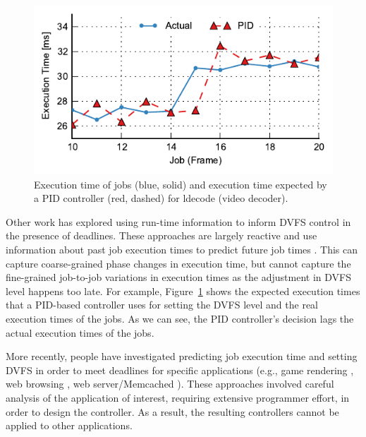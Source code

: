\begin{figure}
  \begin{center}
    \includegraphics{exec_time_prediction/figs/ldecode_pid.pdf}
    \caption{Execution time of jobs (blue, solid) and execution time
    expected by a PID controller (red, dashed) for ldecode (video decoder).}
    \label{fig:exec_time_prediction.applications.ldecode_pid}
  \end{center}
\end{figure}

Other work has explored using run-time information to inform DVFS control in
the presence of deadlines. These approaches are largely reactive and use
information about past job execution times to predict future job times
\cite{gu-dac08, choi-iccad02, pegasus-isca14, nachiappan-hpca15}. This can
capture coarse-grained phase changes in execution time, but cannot capture the
fine-grained job-to-job variations in execution times as the adjustment in DVFS
level happens too late.  For example,
Figure~\ref{fig:exec_time_prediction.applications.ldecode_pid} shows the
expected execution times that a PID-based controller uses for setting the DVFS
level and the real execution times of the jobs. As we can see, the PID
controller's decision lags the actual execution times of the jobs.

More recently, people have investigated predicting job execution time and
setting DVFS in order to meet deadlines for specific applications (e.g., game
rendering \cite{gu-rtas08}, web browsing \cite{zhu-hpca13, eqos-hpca15}, web
server/Memcached \cite{adrenaline-hpca15}). These approaches involved careful
analysis of the application of interest, requiring extensive programmer effort,
in order to design the controller. As a result, the resulting controllers
cannot be applied to other applications.

